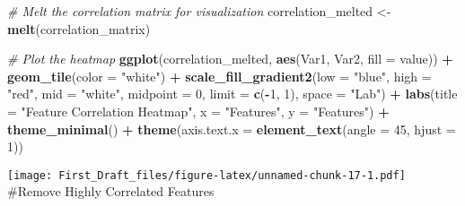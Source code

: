 \documentclass[
]{article}
\newenvironment{Shaded}{\begin{snugshade}}{\end{snugshade}}
\newcommand{\AttributeTok}[1]{\textcolor[rgb]{0.13,0.29,0.53}{#1}}
\newcommand{\CommentTok}[1]{\textcolor[rgb]{0.56,0.35,0.01}{\textit{#1}}}
\newcommand{\DecValTok}[1]{\textcolor[rgb]{0.00,0.00,0.81}{#1}}
\newcommand{\FunctionTok}[1]{\textcolor[rgb]{0.13,0.29,0.53}{\textbf{#1}}}
\newcommand{\NormalTok}[1]{#1}
\newcommand{\OtherTok}[1]{\textcolor[rgb]{0.56,0.35,0.01}{#1}}
\newcommand{\SpecialCharTok}[1]{\textcolor[rgb]{0.81,0.36,0.00}{\textbf{#1}}}
\newcommand{\StringTok}[1]{\textcolor[rgb]{0.31,0.60,0.02}{#1}}
\begin{document}
\begin{Shaded}
\begin{Highlighting}[]
\CommentTok{\# Melt the correlation matrix for visualization}
\NormalTok{correlation\_melted }\OtherTok{\textless{}{-}} \FunctionTok{melt}\NormalTok{(correlation\_matrix)}

\CommentTok{\# Plot the heatmap}
\FunctionTok{ggplot}\NormalTok{(correlation\_melted, }\FunctionTok{aes}\NormalTok{(Var1, Var2, }\AttributeTok{fill =}\NormalTok{ value)) }\SpecialCharTok{+}
  \FunctionTok{geom\_tile}\NormalTok{(}\AttributeTok{color =} \StringTok{"white"}\NormalTok{) }\SpecialCharTok{+}
  \FunctionTok{scale\_fill\_gradient2}\NormalTok{(}\AttributeTok{low =} \StringTok{"blue"}\NormalTok{, }\AttributeTok{high =} \StringTok{"red"}\NormalTok{, }\AttributeTok{mid =} \StringTok{"white"}\NormalTok{, }\AttributeTok{midpoint =} \DecValTok{0}\NormalTok{, }\AttributeTok{limit =} \FunctionTok{c}\NormalTok{(}\SpecialCharTok{{-}}\DecValTok{1}\NormalTok{, }\DecValTok{1}\NormalTok{), }\AttributeTok{space =} \StringTok{"Lab"}\NormalTok{) }\SpecialCharTok{+}
  \FunctionTok{labs}\NormalTok{(}\AttributeTok{title =} \StringTok{"Feature Correlation Heatmap"}\NormalTok{, }\AttributeTok{x =} \StringTok{"Features"}\NormalTok{, }\AttributeTok{y =} \StringTok{"Features"}\NormalTok{) }\SpecialCharTok{+}
  \FunctionTok{theme\_minimal}\NormalTok{() }\SpecialCharTok{+}
  \FunctionTok{theme}\NormalTok{(}\AttributeTok{axis.text.x =} \FunctionTok{element\_text}\NormalTok{(}\AttributeTok{angle =} \DecValTok{45}\NormalTok{, }\AttributeTok{hjust =} \DecValTok{1}\NormalTok{))}
\end{Highlighting}
\end{Shaded}

\texttt{[image: First\_Draft\_files/figure-latex/unnamed-chunk-17-1.pdf]}
\#Remove Highly Correlated Features
\end{document}
